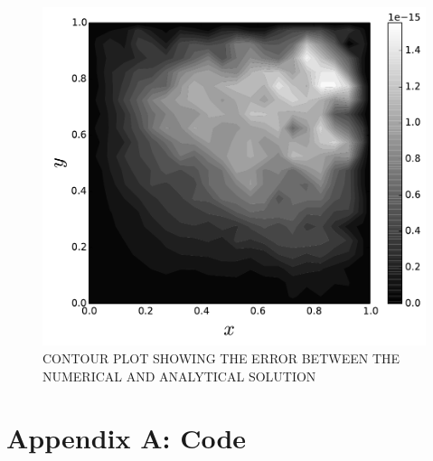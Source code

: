 \documentclass[cleanfoot,cleanhead,twocolumn,10pt,notitlepage]{asme2e}
\begin{document}
\begin{figure}[t]
\begin{center}
    \includegraphics[width=\linewidth]{../Project1_code/error.pdf}
    \caption{CONTOUR PLOT SHOWING THE ERROR BETWEEN THE NUMERICAL AND ANALYTICAL SOLUTION}
    \label{error}
    \end{center}
\end{figure}


\clearpage

\appendix

\section*{Appendix A: Code}


\end{document}
